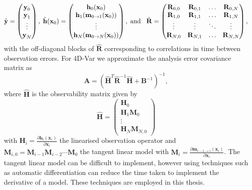 \begin{equation}
\hat{\textbf{y}} =
\begin{pmatrix}
\textbf{y}_0 \\
\textbf{y}_1\\
\vdots \\
\textbf{y}_N
\end{pmatrix},
\hspace{1mm}
\hat{\textbf{h}}(\textbf{x}_0)=
\begin{pmatrix}
\textbf{h}_0(\textbf{x}_0) \\
\textbf{h}_1(\textbf{m}_{0\rightarrow 1}(\mathbf{x}_{0}))\\
\vdots \\
\textbf{h}_N(\textbf{m}_{0\rightarrow N}(\mathbf{x}_{0}))
\end{pmatrix}, \\
\hspace{1mm} \text{and} \hspace{3mm}
\hat{\mathbf{R}} =
\begin{pmatrix}
\mathbf{R}_{0, 0} & \mathbf{R}_{0, 1} & \dots & \mathbf{R}_{0, N} \\
\mathbf{R}_{1, 0} & \mathbf{R}_{1, 1} & \dots & \mathbf{R}_{1, N} \\
\vdots & \vdots & \ddots & \vdots \\
\mathbf{R}_{N, 0} & \mathbf{R}_{N, 1} & \dots & \mathbf{R}_{N, N}
\end{pmatrix},
\end{equation}
with the off-diagonal blocks of \(\hat{\mathbf{R}}\) corresponding to correlations in time between observation errors. For 4D-Var we approximate the analysis error covariance matrix as
\begin{equation}
\textbf{A} = (\hat{\textbf{H}}^{T}\hat{\textbf{R}}^{-1}\hat{\textbf{H}}+\textbf{B}^{-1})^{-1}, \label{chap3:eqn:a_cov_4dvar}
\end{equation}
where \(\hat{\textbf{H}}\) is the observability matrix given by
\begin{equation}
\hat{\mathbf{H}}=
\begin{pmatrix}
\mathbf{H}_0 \\
\mathbf{H}_1\mathbf{M}_0\\
\vdots \\
\mathbf{H}_N\mathbf{M}_{N,0}
\end{pmatrix}
\end{equation}
with $\textbf{H}_i = \frac{\partial \textbf{h}_i(\textbf{x}_i)}{\partial\textbf{x}_i}$ the linearised observation operator and $\mathbf{M}_{i,0}=\mathbf{M}_{i-1}\mathbf{M}_{i-2}\cdots\mathbf{M}_0$ the tangent linear model with $\mathbf{M}_i=\frac{\partial \textbf{m}_{i-1\rightarrow i}(\textbf{x}_{i})}{\partial \textbf{x}_{i}}$. The tangent linear model can be difficult to implement, however using techniques such as automatic differentiation \citep{renaud1997automatic} can reduce the time taken to implement the derivative of a model. These techniques are employed in this thesis.

